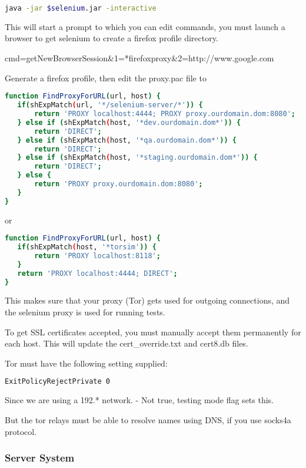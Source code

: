 \begin{lstlisting}[language=sh]
java -jar $selenium.jar -interactive
\end{lstlisting}

This will start a prompt to which you can edit commands, you must launch a browser to get selenium to create a firefox profile directory.

cmd=getNewBrowserSession&1=*firefoxproxy&2=http://www.google.com

Generate a firefox profile, then edit the proxy.pac file to 

\begin{lstlisting}[language=sh]
function FindProxyForURL(url, host) {
   if(shExpMatch(url, '*/selenium-server/*')) {
       return 'PROXY localhost:4444; PROXY proxy.ourdomain.dom:8080';
   } else if (shExpMatch(host, '*dev.ourdomain.dom*')) {
       return 'DIRECT';
   } else if (shExpMatch(host, '*qa.ourdomain.dom*')) {
       return 'DIRECT';
   } else if (shExpMatch(host, '*staging.ourdomain.dom*')) {
       return 'DIRECT';
   } else {
       return 'PROXY proxy.ourdomain.dom:8080';
   }
}
\end{lstlisting}

or

\begin{lstlisting}[language=sh]
function FindProxyForURL(url, host) {
   if(shExpMatch(host, '*torsim')) {
       return 'PROXY localhost:8118';
   }
   return 'PROXY localhost:4444; DIRECT';
}
\end{lstlisting}

This makes sure that your proxy (Tor) gets used for outgoing connections, and the selenium proxy is used for running tests.

To get SSL certificates accepted, you must manually accept them permanently for each host. This will update the cert_override.txt and cert8.db files.

Tor must have the following setting supplied:

\begin{lstlisting}[language=sh]
ExitPolicyRejectPrivate 0
\end{lstlisting}

Since we are using a 192.* network. - Not true, testing mode flag sets this.

But the tor relays must be able to resolve names using DNS, if you use socks4a protocol.

\subsubsection{Server System}

